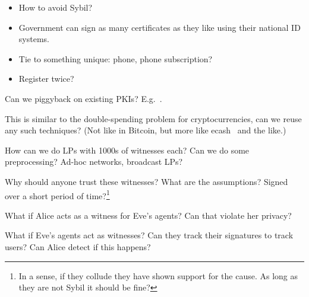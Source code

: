 \begin{frame}
  \begin{question}
    \begin{itemize}
      \item How to avoid Sybil?
      \item Government can sign as many certificates as they like using their 
        national ID systems.
      \item Tie to something unique: phone, phone subscription?
      \item Register twice?
    \end{itemize}
  \end{question}

  \begin{question}
    Can we piggyback on existing \acp{PKI}?
    E.g.~\cite{Cinderella}.
  \end{question}

  \begin{question}
    This is similar to the double-spending problem for cryptocurrencies, can 
    we reuse any such techniques?
    (Not like in Bitcoin, but more like ecash~\cite{ecash} and the like.)
  \end{question}
\end{frame}


\begin{frame}
\begin{question}
  How can we do \acp{LP} with 1000s of witnesses each?
  Can we do some preprocessing?
  Ad-hoc networks, broadcast \acp{LP}?
\end{question}
\end{frame}

\begin{frame}
\begin{question}
  Why should anyone trust these witnesses?
  What are the assumptions?
  Signed over a short period of time?\footnote{%
    In a sense, if they collude they have shown support for the cause.
    As long as they are not Sybil it should be fine?
  }
\end{question}

\pause

\begin{question}
  What if Alice acts as a witness for Eve's agents?
  Can that violate her privacy?
\end{question}

\pause

\begin{question}
  What if Eve's agents act as witnesses?
  Can they track their signatures to track users?
  Can Alice detect if this happens?
\end{question}
\end{frame}

